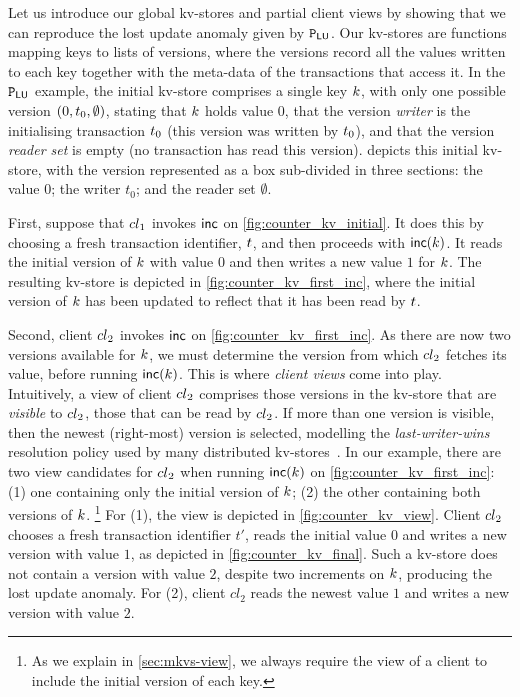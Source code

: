Let us introduce  our global kv-stores and partial client views by
showing that we can reproduce the lost update anomaly given by 
\(\mathtt{P}_{\mathsf{LU}}\).
Our kv-stores are functions mapping keys to lists of versions, where
the versions  record all the values written to each key together with the
meta-data of the transactions that access it. 
In the \(\mathtt{P}_{\mathsf{LU}}\) example, the initial kv-store comprises a single key \(k\), with only one possible 
version \((0, t_{0}, \emptyset)\),  stating that \(k\) holds value \(0\), 
that the version \emph{writer} is the initialising transaction
\(t_0\) (this version was written by \(t_0\)), 
and that the version \emph{reader set} is empty (no transaction has read this version). 
 depicts this initial kv-store, with the version
represented as a box sub-divided in three sections: the value \(0\);
the writer \(t_0\); and the reader set \(\emptyset\). 


First, suppose that \({cl}_1\)  invokes \(\mathsf{inc}\) on
\cref{fig:counter_kv_initial}. It does this by choosing a fresh
transaction identifier, \(t\), 
and then proceeds with \(\mathsf{inc}(k)\). It reads the initial version
of \(k\) with value \(0\) 
and then writes a new value \(1\) for \(k\). 
The resulting kv-store is depicted in \cref{fig:counter_kv_first_inc},
where  the initial version of \(k\)  has been  updated to reflect that it
has been read by \(t\). 

Second, client \({cl}_2\) invokes \(\mathsf{inc}\) on
\cref{fig:counter_kv_first_inc}.  As there are now two versions
available for \(k\), we must determine the version from which
\({cl}_2\) fetches its value, before running \(\mathsf{inc}(k)\).  This is
where \emph{client views} come into play.  Intuitively, a view of
client \({cl}_2\) comprises those versions in the kv-store that are
\emph{visible} to \({cl}_2\), \ie those that can be read by
\({cl}_2\).  If more than one version is visible, then the newest
(right-most) version is selected, modelling the \emph{last-writer-wins}
resolution policy used by many distributed
kv-stores~\cite{vogels:2009:ec:1435417.1435432}.  In our example,
there are two view candidates for \({cl}_2\) when running
\(\mathsf{inc}(k)\) on \cref{fig:counter_kv_first_inc}: (1) one containing
only the initial version of \(k\); (2) the other containing both
versions of \(k\).%
\footnote{ As we explain in \cref{sec:mkvs-view}, we always require
  the view of a client to include the initial version of each key.}  
For (1), the view is depicted in
\cref{fig:counter_kv_view}.  Client \({cl}_2\) chooses a fresh
transaction identifier \(t'\), reads the initial value \(0\) and writes a
new version with value \(1\), as depicted in
\cref{fig:counter_kv_final}.  Such a kv-store does not contain a
version with value \(2\), despite two increments on \(k\), producing
the lost update anomaly.  For (2), client \(cl_2\) reads the newest
value \(1\) and writes a new version with value \(2\).

